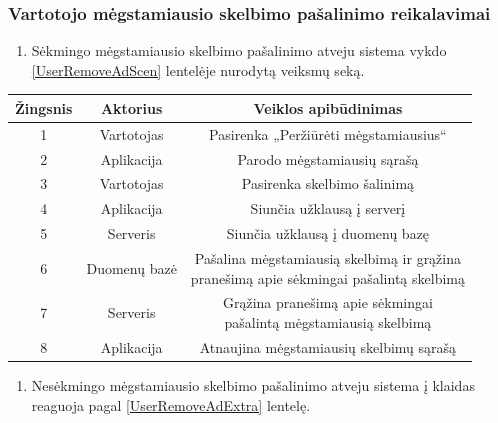 \documentclass[12pt]{article}
\begin{document}
	\subsubsection{Vartotojo mėgstamiausio skelbimo pašalinimo reikalavimai}
	\begin{enumerate}[labelindent=10pt,leftmargin=2.2cm]
		\item Sėkmingo mėgstamiausio skelbimo pašalinimo atveju sistema vykdo \ref{UserRemoveAdScen} lentelėje nurodytą veiksmų seką.
	\end{enumerate}
		
		\begin{center}
		\begin{tabular}{ | c | c | c | }
			\hline
			Žingsnis & Aktorius       & Veiklos apibūdinimas \\ \hline
			1        & Vartotojas     & Pasirenka „Peržiūrėti mėgstamiausius“ \\ \hline
			2        & Aplikacija     & Parodo mėgstamiausių sąrašą \\ \hline
			3        & Vartotojas     & Pasirenka skelbimo šalinimą \\ \hline
			4        & Aplikacija     & Siunčia užklausą į serverį \\ \hline
			5        & Serveris       & Siunčia užklausą į duomenų bazę  \\ \hline
			6        & Duomenų bazė   & \makecell{Pašalina mėgstamiausią skelbimą ir grąžina \\ pranešimą apie sėkmingai pašalintą skelbimą} \\ \hline
			7        & Serveris       & \makecell{Grąžina pranešimą apie sėkmingai \\ pašalintą mėgstamiausią skelbimą} \\ \hline
			8        & Aplikacija     & Atnaujina mėgstamiausių skelbimų sąrašą \\ \hline
		\end{tabular}
		\end{center}
		\bigskip

	\begin{enumerate}[resume,labelindent=10pt,leftmargin=2.2cm]
		\item Nesėkmingo mėgstamiausio skelbimo pašalinimo atveju sistema į klaidas reaguoja pagal \ref{UserRemoveAdExtra} lentelę.
	\end{enumerate}	
\end{document}
